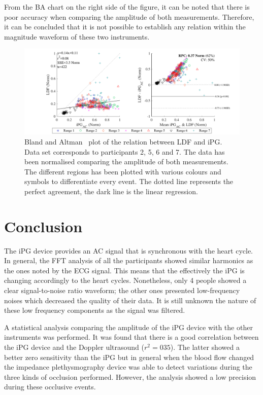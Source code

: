 From the BA chart on the right side of the figure, it can be noted that there is poor accuracy when comparing the amplitude of both measurements. Therefore, it can be concluded that it is not possible to establish any relation within the magnitude waveform of these two instruments.

\begin{figure}[!htpb]
	\includegraphics[width=1\textwidth,keepaspectratio]{figure4}    
	\caption[Bland and Altman plot of the relation between LDF and iPG]{Bland and Altman~\cite{bland1986statistical} plot of the relation between LDF and iPG. Data set corresponds to participants 2, 5, 6 and 7. The data has been normalised comparing the amplitude of both measurements. The different regions has been plotted with various colours and symbols to differentiate every event. The dotted line represents the perfect agreement, the dark line is the linear regression.}
	\label{fig:corr LDF}
\end{figure}

\section{Conclusion}  %
\label{section correlation 5}
The iPG device provides an AC signal that is synchronous with the heart cycle. In general, the FFT analysis of all the participants showed similar harmonics as the ones noted by the ECG signal. This means that the effectively the iPG is changing accordingly to the heart cycles. Nonetheless, only 4 people showed a clear signal-to-noise ratio waveform; the other ones presented low-frequency noises which decreased the quality of their data. It is still unknown the nature of these low frequency components as the signal was filtered.

A statistical analysis comparing the amplitude of the iPG device with the other instruments was performed.  It was found that there is a good correlation between the iPG device and the Doppler ultrasound ($r^2 = 035$). The latter showed a better zero sensitivity than the iPG but in general when the blood flow changed the impedance plethysmography device was able to detect variations during the three kinds of occlusion performed. However, the analysis showed a low precision during these occlusive events. 

